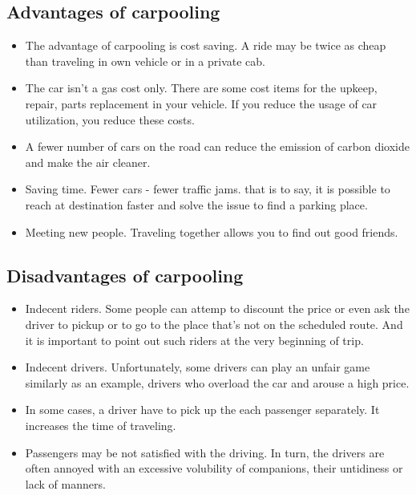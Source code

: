 \subsection{Advantages of carpooling}
\begin{itemize}
\item The advantage of carpooling is cost saving. A ride may be twice as cheap than traveling in own vehicle or in a private cab.
\item The car isn't a gas cost only. There are some cost items for the upkeep, repair, parts replacement in your vehicle. If you reduce the usage of car utilization, you reduce these costs.
\item A fewer number of cars on the road can reduce the emission of carbon dioxide and make the air cleaner. 
\item Saving time. Fewer cars - fewer traffic jams. that is to say, it is possible to reach at destination faster and solve the issue to find a parking place.
\item Meeting new people. Traveling together allows you to find out good friends. 
\end{itemize}

\subsection{Disadvantages of carpooling}
\begin{itemize}
\item Indecent riders. Some people can attemp to discount the price or even ask the driver to pickup or to go to the place that's not on the scheduled route. And it is important to point out such riders at the very beginning of trip.  
\item Indecent drivers. Unfortunately, some drivers can play an unfair game similarly as an example, drivers who overload the car and arouse a high price. 
\item In some cases, a driver have to pick up the each passenger separately. It increases the time of traveling.
\item Passengers may be not satisfied with the driving. In turn, the drivers are often annoyed with an excessive volubility of companions, their untidiness or lack of manners.
\end{itemize}